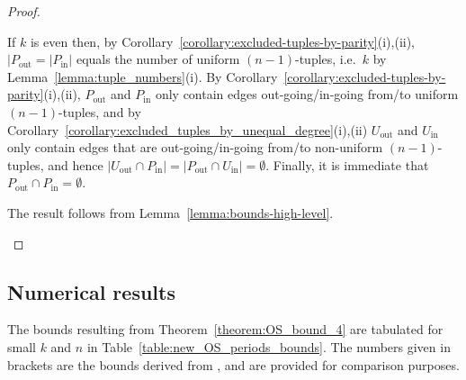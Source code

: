 \documentclass[a4paper,11pt]{article}
\begin{document}
\begin{proof}
\begin{itemize}
    If $k$ is even then, by Corollary~\ref{corollary:excluded-tuples-by-parity}(i),(ii),
    $|P_{\text{out}}=|P_{\text{in}}|$ equals the number of uniform $(n-1)$-tuples, i.e.\ $k$ by
    Lemma~\ref{lemma:tuple_numbers}(i).
    \newline By Corollary~\ref{corollary:excluded-tuples-by-parity}(i),(ii), $P_{\text{out}}$
    and $P_{\text{in}}$ only contain edges out-going/in-going from/to uniform $(n-1)$-tuples,
    and by Corollary~\ref{corollary:excluded_tuples_by_unequal_degree}(i),(ii) $U_{\text{out}}$
    and $U_{\text{in}}$ only contain edges that are out-going/in-going from/to non-uniform
    $(n-1)$-tuples, and hence $|U_{\text{out}}\cap P_{\text{in}}|=|P_{\text{out}}\cap
    U_{\text{in}}|=\emptyset$.
    \newline Finally, it is immediate that $P_{\text{out}}\cap P_{\text{in}}=\emptyset$.

    The result follows from Lemma~\ref{lemma:bounds-high-level}.

\end{itemize}
\end{proof}

\subsection{Numerical results}

The bounds resulting from Theorem~\ref{theorem:OS_bound_4} are tabulated for small $k$ and $n$ in
Table~\ref{table:new_OS_periods_bounds}.  The numbers given in brackets are the bounds derived from
\cite[Theorem 4.11]{Alhakim24a}, and are provided for comparison purposes.
\end{document}
